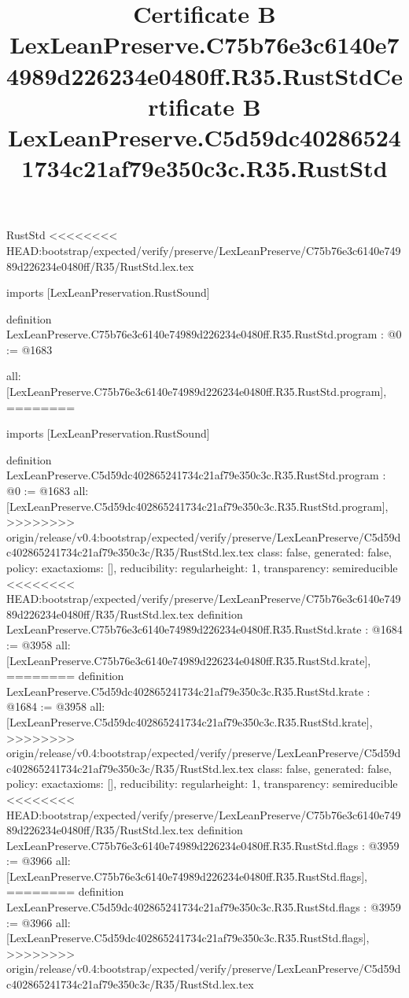 \begin{lexlean}{RustStd}
<<<<<<<< HEAD:bootstrap/expected/verify/preserve/LexLeanPreserve/C75b76e3c6140e74989d226234e0480ff/R35/RustStd.lex.tex
\title{Certificate B LexLeanPreserve.C75b76e3c6140e74989d226234e0480ff.R35.RustStd}
\begin{coremodule}
imports [LexLeanPreservation.RustSound]

definition LexLeanPreserve.C75b76e3c6140e74989d226234e0480ff.R35.RustStd.program : @0 := @1683 {
  all: [LexLeanPreserve.C75b76e3c6140e74989d226234e0480ff.R35.RustStd.program],
========
\title{Certificate B LexLeanPreserve.C5d59dc402865241734c21af79e350c3c.R35.RustStd}
\begin{coremodule}
imports [LexLeanPreservation.RustSound]

definition LexLeanPreserve.C5d59dc402865241734c21af79e350c3c.R35.RustStd.program : @0 := @1683 {
  all: [LexLeanPreserve.C5d59dc402865241734c21af79e350c3c.R35.RustStd.program],
>>>>>>>> origin/release/v0.4:bootstrap/expected/verify/preserve/LexLeanPreserve/C5d59dc402865241734c21af79e350c3c/R35/RustStd.lex.tex
  class: false,
  generated: false,
  policy: exact{axioms: []},
  reducibility: regular{height: 1},
  transparency: semireducible
}
<<<<<<<< HEAD:bootstrap/expected/verify/preserve/LexLeanPreserve/C75b76e3c6140e74989d226234e0480ff/R35/RustStd.lex.tex
definition LexLeanPreserve.C75b76e3c6140e74989d226234e0480ff.R35.RustStd.krate : @1684 := @3958 {
  all: [LexLeanPreserve.C75b76e3c6140e74989d226234e0480ff.R35.RustStd.krate],
========
definition LexLeanPreserve.C5d59dc402865241734c21af79e350c3c.R35.RustStd.krate : @1684 := @3958 {
  all: [LexLeanPreserve.C5d59dc402865241734c21af79e350c3c.R35.RustStd.krate],
>>>>>>>> origin/release/v0.4:bootstrap/expected/verify/preserve/LexLeanPreserve/C5d59dc402865241734c21af79e350c3c/R35/RustStd.lex.tex
  class: false,
  generated: false,
  policy: exact{axioms: []},
  reducibility: regular{height: 1},
  transparency: semireducible
}
<<<<<<<< HEAD:bootstrap/expected/verify/preserve/LexLeanPreserve/C75b76e3c6140e74989d226234e0480ff/R35/RustStd.lex.tex
definition LexLeanPreserve.C75b76e3c6140e74989d226234e0480ff.R35.RustStd.flags : @3959 := @3966 {
  all: [LexLeanPreserve.C75b76e3c6140e74989d226234e0480ff.R35.RustStd.flags],
========
definition LexLeanPreserve.C5d59dc402865241734c21af79e350c3c.R35.RustStd.flags : @3959 := @3966 {
  all: [LexLeanPreserve.C5d59dc402865241734c21af79e350c3c.R35.RustStd.flags],
>>>>>>>> origin/release/v0.4:bootstrap/expected/verify/preserve/LexLeanPreserve/C5d59dc402865241734c21af79e350c3c/R35/RustStd.lex.tex
}}}
\end{coremodule}}
\end{coremodule}
\end{lexlean}
